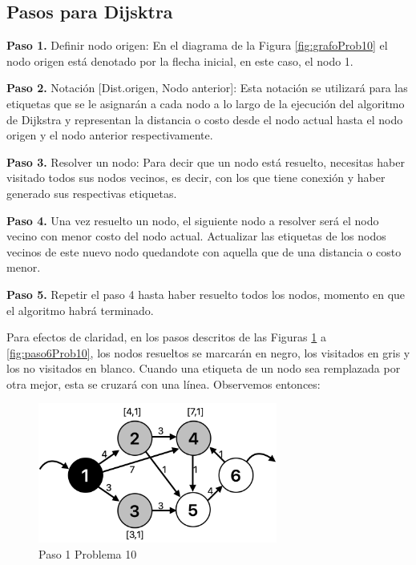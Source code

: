 \documentclass[12pt]{article}  %
\begin{document}
\subsection{Pasos para Dijsktra}

\textbf{Paso 1.} Definir nodo origen: En el diagrama de la Figura \ref{fig:grafoProb10} el nodo origen está denotado por la flecha inicial, en este caso, el nodo 1.

\textbf{Paso 2.} Notación [Dist.origen, Nodo anterior]: Esta notación se utilizará para las etiquetas que se le asignarán a cada nodo a lo largo de la ejecución del algoritmo de Dijkstra y representan la distancia o costo desde el nodo actual hasta el nodo origen y el nodo anterior respectivamente.

\textbf{Paso 3.} Resolver un nodo: Para decir que un nodo está resuelto, necesitas haber visitado todos sus nodos vecinos, es decir, con los que tiene conexión y haber generado sus respectivas etiquetas.

\textbf{Paso 4.} Una vez resuelto un nodo, el siguiente nodo a resolver será el nodo vecino con menor costo del nodo actual. Actualizar las etiquetas de los nodos vecinos de este nuevo nodo quedandote con aquella que de una distancia o costo menor.

\textbf{Paso 5.} Repetir el paso 4 hasta haber resuelto todos los nodos, momento en que el algoritmo habrá terminado.

Para efectos de claridad, en los pasos descritos de las Figuras \ref{fig:paso1Prob10} a \ref{fig:paso6Prob10}, los nodos resueltos se marcarán en negro, los visitados en gris y los no visitados en blanco. Cuando una etiqueta de un nodo sea remplazada por otra mejor, esta se cruzará con una línea. Observemos entonces:

\begin{figure}[H]
\centering
\caption{Paso 1 Problema 10}
\label{fig:paso1Prob10}
\includegraphics[width=0.7\textwidth]{paso1Prob10.png}
\end{figure}
\end{document}
